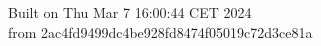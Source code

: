 {\noindent Built on Thu Mar  7 16:00:44 CET 2024} \\ 
 {\noindent from 2ac4fd9499dc4be928fd8474f05019c72d3ce81a}
